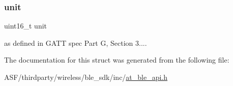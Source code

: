 \subsubsection{\texorpdfstring{unit}{unit}}
{\footnotesize\ttfamily uint16\+\_\+t unit}

as defined in G\+A\+TT spec Part G, Section 3.... 

The documentation for this struct was generated from the following file\+:\begin{DoxyCompactItemize}
\item 
A\+S\+F/thirdparty/wireless/ble\+\_\+sdk/inc/\mbox{\hyperlink{at__ble__api_8h}{at\+\_\+ble\+\_\+api.\+h}}\end{DoxyCompactItemize}
